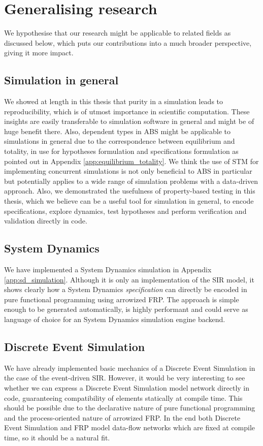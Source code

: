 \section{Generalising research}
We hypothesise that our research might be applicable to related fields as discussed below, which puts our contributions into a much broader perspective, giving it more impact.

\subsection{Simulation in general}
We showed at length in this thesis that purity in a simulation leads to reproducibility, which is of utmost importance in scientific computation. These insights are easily transferable to simulation software in general and might be of huge benefit there. Also, dependent types in ABS might be applicable to simulations in general due to the correspondence between equilibrium and totality, in use for hypotheses formulation and specifications formulation as pointed out in Appendix \ref{app:equilibrium_totality}.  We think the use of STM for implementing concurrent simulations is not only beneficial to ABS in particular but potentially applies to a wide range of simulation problems with a data-driven approach. Also, we demonstrated the usefulness of property-based testing in this thesis, which we believe can be a useful tool for simulation in general, to encode specifications, explore dynamics, test hypotheses and perform verification and validation directly in code.

\subsection{System Dynamics}
We have implemented a System Dynamics simulation in Appendix \ref{app:sd_simulation}. Although it is only an implementation of the SIR model, it shows clearly how a System Dynamics \textit{specification} can directly be encoded in pure functional programming using arrowized FRP. The approach is simple enough to be generated automatically, is highly performant and could serve as language of choice for an System Dynamics simulation engine backend.

\subsection{Discrete Event Simulation}
We have already implemented basic mechanics of a Discrete Event Simulation in the case of the event-driven SIR. However, it would be very interesting to see whether we can express a Discrete Event Simulation model network directly in code, guaranteeing compatibility of elements statically at compile time. This should be possible due to the declarative nature of pure functional programming and the process-oriented nature of arrowized FRP. In the end both Discrete Event Simulation and FRP model data-flow networks which are fixed at compile time, so it should be a natural fit.

